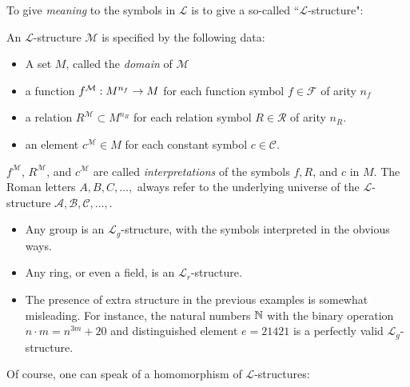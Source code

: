 To give \emph{meaning} to the symbols in $\mathcal{L}$ is to give a so-called ``$\mathcal{L}$-structure":

\begin{definition}
An $\mathcal{L}$-structure $\mathcal{M}$ is specified by the following data:
\begin{itemize}
	\item A set $M$, called the \emph{domain} of $\mathcal{M}$
	\item a function $f^{\mathcal{M}}:M^{n_f}\rightarrow M$ for each function symbol $f\in\mathcal{F}$ of arity $n_f$
	\item a relation $R^{\mathcal{M}}\subset M^{n_R}$ for each relation symbol $R\in\mathcal{R}$ of arity $n_R$.
	\item an element $c^{\mathcal{M}}\in M$ for each constant symbol $c\in\mathcal{C}$.
\end{itemize}
$f^{\mathcal{M}}$, $R^{\mathcal{M}}$, and $c^{\mathcal{M}}$ are called \emph{interpretations} of the symbols $f, R$, and $c$ in $M$. The Roman letters $A,B,C,\dots,$ always refer to the underlying universe of the $\mathcal{L}$-structure $\mathcal{A},\mathcal{B},\mathcal{C},\dots,$.
\end{definition}

\begin{example}
	\begin{itemize}
		\item Any group is an $\mathcal{L}_g$-structure, with the symbols interpreted in the obvious ways.
		\item Any ring, or even a field, is an $\mathcal{L}_r$-structure.
		\item The presence of extra structure in the previous examples is somewhat misleading. For instance, the natural numbers $\mathbb{N}$ with the binary operation $n\cdot m = n^{3m}+20$ and distinguished element $e=21421$ is a perfectly valid $\mathcal{L}_g$-structure.
	\end{itemize}
\end{example}

Of course, one can speak of a homomorphism of $\mathcal{L}$-structures:

